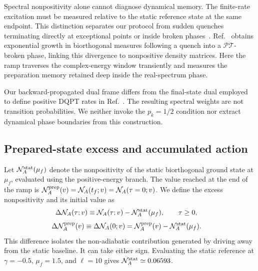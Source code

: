 \documentclass[aps,prb,reprint,superscriptaddress,amsmath,amssymb,floatfix]{revtex4-2}
\begin{document}
Spectral nonpositivity alone cannot diagnose dynamical memory. The finite-rate excitation must be measured relative to the static reference state at the same endpoint. This distinction separates our protocol from sudden quenches terminating directly at exceptional points or inside broken phases~\cite{BacsiDora2021,LuChang2026}. Ref.~\cite{LuChang2026} obtains exponential growth in biorthogonal measures following a quench into a $\mathcal{PT}$-broken phase, linking this divergence to nonpositive density matrices. Here the ramp traverses the complex-energy window transiently and measures the preparation memory retained deep inside the real-spectrum phase.

Our backward-propagated dual frame differs from the final-state dual employed to define positive DQPT rates in Ref.~\cite{Jafari2026}. The resulting spectral weights are not transition probabilities. We neither invoke the $p_k=1/2$ condition nor extract dynamical phase boundaries from this construction.

\subsection{Prepared-state excess and accumulated action}
\label{sec:prep_memory}

 Let $\mathcal N_A^{\rm stat}(\mu_f)$ denote the nonpositivity of the static biorthogonal ground state at $\mu_f$, evaluated using the positive-energy branch. The value reached at the end of the ramp is $\mathcal N_A^{\rm prep}(v)=\mathcal N_A(t_f;v)=\mathcal N_A(\tau=0;v)$. We define the excess nonpositivity and its initial value as
\begin{equation}
\begin{aligned}
\Delta\mathcal N_A(\tau;v) &\equiv \mathcal N_A(\tau;v) - \mathcal N_A^{\rm stat}(\mu_f), \qquad \tau\ge0,
\end{aligned} \label{eq:excess_nonpositivity_time}
\end{equation}
\begin{equation}
\begin{aligned}
\Delta\mathcal N_A^{\rm prep}(v) &\equiv \Delta\mathcal N_A(0;v) = \mathcal N_A^{\rm prep}(v) - \mathcal N_A^{\rm stat}(\mu_f).
\end{aligned} \label{eq:excess_nonpositivity_prep}
\end{equation}
This difference isolates the non-adiabatic contribution generated by driving away from the static baseline. It can take either sign. Evaluating the static reference at $\gamma=-0.5$, $\mu_f=1.5$, and $\ell=10$ gives $\mathcal N_A^{\rm stat}\simeq0.06593$.
\end{document}
